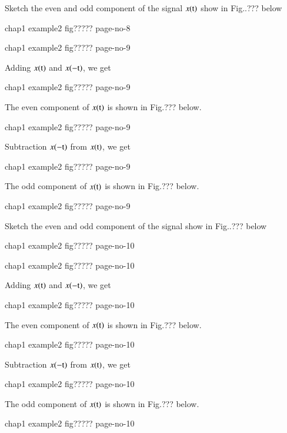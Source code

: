 \begin{exam*}
Sketch the even and odd component of the signal $x(\textrm{t})$ show in Fig..??? below
\begin{center}
chap1 example2  fig????? page-no-8 
\end{center}
\end{exam*}
\begin{solution}
\begin{center}
chap1 example2  fig????? page-no-9 
\end{center}

Adding $x(\textrm{t})$ and $x(-\textrm{t})$, we get
\begin{center}
chap1 example2  fig????? page-no-9 
\end{center}

The even component of $x(\textrm{t})$ is shown in Fig.??? below.
\begin{center}
chap1 example2  fig????? page-no-9 
\end{center}

Subtraction $x(-\textrm{t})$ from $ x(\textrm{t})$, we get
\begin{center}
chap1 example2  fig????? page-no-9 
\end{center}

The odd component of $x(\textrm{t})$ is shown in Fig.??? below.
\begin{center}
chap1 example2  fig????? page-no-9 
\end{center}
\end{solution}


\begin{exam*}
Sketch the even and odd component of the signal  show in Fig..??? below
\begin{center}
chap1 example2  fig????? page-no-10 
\end{center}
\end{exam*}
\begin{solution}
\begin{center}
chap1 example2  fig????? page-no-10 
\end{center}

Adding $x(\textrm{t})$ and $x(-\textrm{t})$, we get
\begin{center}
chap1 example2  fig????? page-no-10 
\end{center}

The even component of $x(\textrm{t})$ is shown in Fig.??? below.
\begin{center}
chap1 example2  fig????? page-no-10 
\end{center}

Subtraction $x(-\textrm{t})$ from $ x(\textrm{t})$, we get
\begin{center}
chap1 example2  fig????? page-no-10 
\end{center}

The odd component of $x(\textrm{t})$ is shown in Fig.??? below.
\begin{center}
chap1 example2  fig????? page-no-10 
\end{center}
\end{solution}

